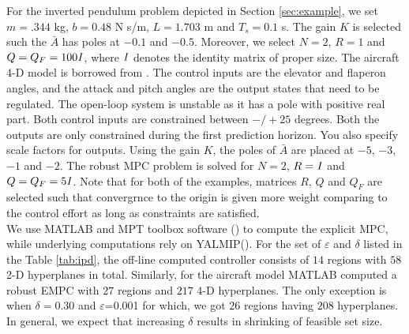 For the inverted pendulum problem depicted in Section \ref{sec:example}, we set  $m=.344$ kg, $b=0.48$ N s/m, $L=1.703$ m and $T_s=0.1$ s. The gain $K$ is selected such the $\bar A$ has poles at $-0.1$ and $-0.5$. Moreover, we select $N=2$, $R=1$ and $Q=Q_F=100\mathbf{\it I}$, where $\mathbf{ \it I}$ denotes the identity matrix of proper size. The aircraft 4-D model is borrowed from \cite{Kapasouris:1998}. The control inputs are the elevator and flaperon angles, and the attack and pitch angles are the output states that need to be regulated. The open-loop system is unstable as it has a pole with positive real part. Both control inputs are constrained between $-/+25$ degrees. Both the outputs are only constrained during the first prediction horizon. You also specify scale factors for outputs. Using the gain $K$, the poles of $\bar A$ are placed at $-5$, $-3$, $-1$ and $-2$. The robust MPC problem is solved for $N=2$, $R=\mathbf{\it I}$ and $Q=Q_F=5\mathbf{\it I}$. Note that for both of the examples, matrices $R$, $Q$ and $Q_F$ are selected such that convergrnce to the origin is given more weight comparing to the control effort as long as constraints are satisfied. \\
We use MATLAB and MPT toolbox software (\cite{matlabMPT})  to compute the explicit MPC, while underlying computations rely on YALMIP(\cite{matlabYALMIP}). For the set of $\varepsilon$ and $\delta$ listed in the Table \ref{tab:ipd}, the off-line computed controller consists of $14$ regions with $58$ 2-D hyperplanes in total. Similarly, for the aircraft model MATLAB computed a robust EMPC with $27$ regions and $217$ 4-D hyperplanes. The only exception is when $\delta=0.30$ and $\varepsilon$=0.001 for which, we got $26$ regions having $208$ hyperplanes. In general, we expect that increasing $\delta$ results in shrinking of feasible set size.%



